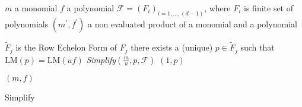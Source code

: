 \begin{algorithm}[ht]
  \begin{algorithmic}[1]
    \Require
      \Statex $m$ a monomial
      \Statex $f$ a polynomial
      \Statex $\mathcal{F} = (F_i)_{i=1,\ldots,(d-1)}$, where $F_i$ is finite set of polynomials
    \Ensure
      \Statex $(m^\prime, f^\prime)$ a non evaluated product of a monomial and a polynomial
      \Statex

        \State $\tilde{F}_j$ is the Row Echelon Form of $F_j$
        \State there exists a (unique) $p\in \tilde{F}_j$ such that $\textrm{LM}(p) = \textrm{LM}(u f)$
          \State \Return \textit{Simplify}$(\frac{m}{u}, p, \mathcal{F})$
        \Else
          \State \Return $(1, p)$
        \EndIf
      \EndIf
    \EndFor

    \State \Return $(m, f)$

  \end{algorithmic}
  \caption{Simplify}
  \label{alg:simplify}
\end{algorithm}

